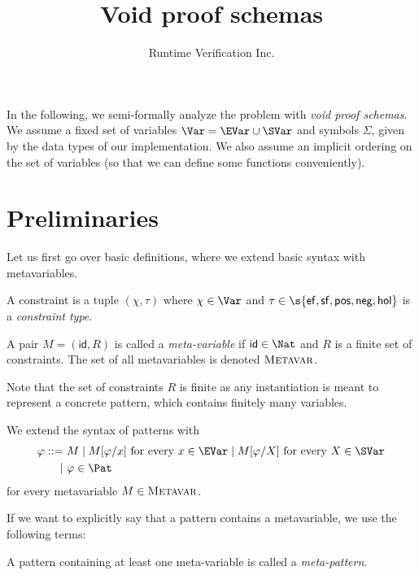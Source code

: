 \documentclass{mgr}
\title{Void proof schemas}
\author{Runtime Verification Inc.}
\begin{document}
\maketitle

\newcommand{\Metavar}{\textsc{Metavar}}
\newcommand{\Ef}{\mathsf{ef}}
\newcommand{\Sf}{\mathsf{sf}}
\newcommand{\Pos}{\mathsf{pos}}
\newcommand{\Neg}{\mathsf{neg}}
\newcommand{\Hol}{\mathsf{hol}}

In the following, we semi-formally analyze the problem with \emph{void proof schemas}.
We assume a fixed set of variables $\Var = \EVar \cup \SVar$ and symbols $\Sigma$, given by the data types of our implementation.
We also assume an implicit ordering on the set of variables (so that we can define some functions conveniently).

\section{Preliminaries}

Let us first go over basic definitions, where we extend basic syntax with metavariables.

\begin{definition}[Constraints]
  A constraint is a tuple $(\chi, \tau)$ where $\chi \in \Var$ and $\tau \in \s{\Ef, \Sf, \Pos, \Neg, \Hol}$ is a \emph{constraint type}.
\end{definition}

\begin{definition}
  A pair $M = (\mathsf{id}, R)$ is called a \emph{meta-variable} if $\mathsf{id} \in \Nat$ and $R$ is a finite set of constraints.
  The set of all metavariables is denoted $\Metavar$.
\end{definition}

Note that the set of constraints $R$ is finite as any instantiation is meant to represent a concrete pattern, which contains finitely many variables.

\begin{definition}[Patterns]
  We extend the syntax of patterns with
  \begin{align*}
    \varphi ::= &\ M \mid M[\varphi/x] \text{ for every }x \in \EVar \mid M[\varphi/ X]\text{ for every }X \in \SVar \\
    \mid &\ \varphi \in \Pat
  \end{align*}
  for every metavariable $M \in \Metavar$.
\end{definition}

If we want to explicitly say that a pattern contains a metavariable, we use the following terms:
\begin{definition}
  A pattern containing at least one meta-variable is called a \emph{meta-pattern}.
\end{definition}
\end{document}
